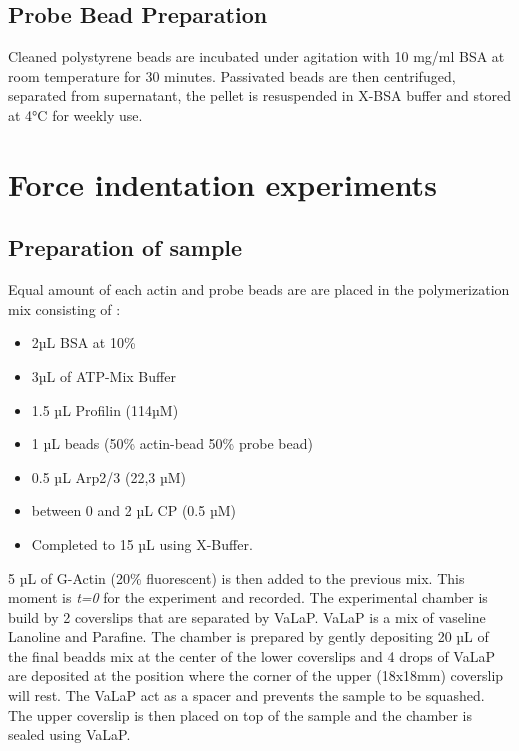 \documentclass[A4paperpaper,11pt,english]{sphinxmanual}
\begin{document}
\subsection{Probe Bead Preparation}
\label{parts/part2:probe-bead-preparation}
Cleaned polystyrene beads are incubated under agitation with 10 mg/ml BSA at
room temperature for 30 minutes. Passivated beads are then centrifuged,
separated from supernatant, the pellet is resuspended in X-BSA buffer and
stored at 4°C for weekly use.


\section{Force indentation experiments}
\label{parts/part2:id6}\label{parts/part2:force-indentation-experiments}

\subsection{Preparation of sample}
\label{parts/part2:preparation-of-sample}
Equal amount of each actin and probe beads are are placed in the polymerization
mix consisting of :
\begin{itemize}
\item {} 
2µL BSA at 10\%

\item {} 
3µL of ATP-Mix Buffer

\item {} 
1.5 µL Profilin (114µM)

\item {} 
1 µL beads (50\% actin-bead 50\% probe bead)

\item {} 
0.5 µL Arp2/3 (22,3 µM)

\item {} 
between 0 and 2 µL CP (0.5 µM)

\item {} 
Completed to 15 µL using X-Buffer.

\end{itemize}

5 µL of G-Actin (20\% fluorescent) is then added to the previous mix. This
moment is \emph{t=0} for the experiment and recorded. The experimental chamber is
build by 2 coverslips that are separated by VaLaP. VaLaP is a mix of vaseline
Lanoline and Parafine. The chamber is prepared by gently depositing 20 µL of
the final beadds mix at the center of the lower coverslips and 4 drops of VaLaP
are deposited at the position where the corner of the upper (18x18mm) coverslip
will rest. The VaLaP act as a spacer and prevents the sample to be squashed.  The
upper coverslip is then placed on top of the sample and the chamber is sealed
using VaLaP.
\end{document}

